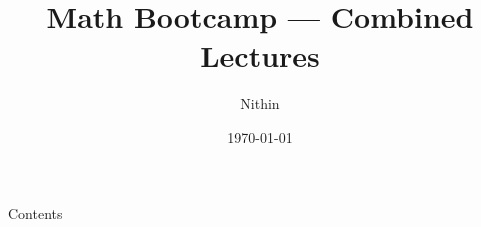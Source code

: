 \documentclass{beamer}
\title{Math Bootcamp — Combined Lectures}
\author{Nithin}
\date{\today}
\begin{document}
\frame{\titlepage}
\begin{frame}[allowframebreaks]{Contents}
  \tableofcontents
\end{frame}




\end{document}
